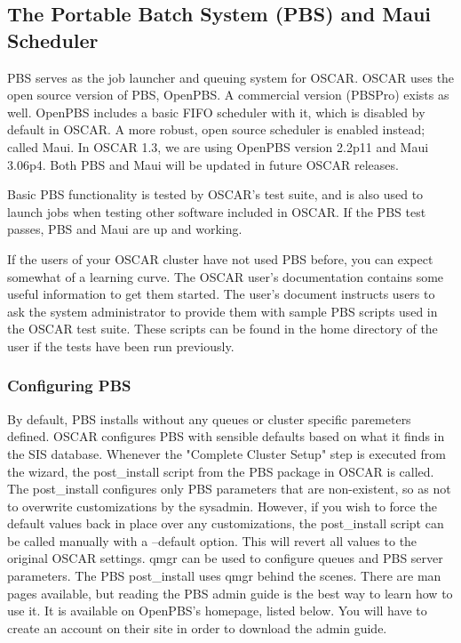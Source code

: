 %
%
%

\subsection{The Portable Batch System (PBS) and Maui Scheduler}
\label{app:pbs-overview}

PBS serves as the job launcher and queuing system for OSCAR.  OSCAR
uses the open source version of PBS, OpenPBS.  A commercial version
(PBSPro) exists as well.  OpenPBS includes a basic FIFO scheduler with
it, which is disabled by default in OSCAR.  A more robust, open source
scheduler is enabled instead; called Maui.  In OSCAR 1.3, we are using
OpenPBS version 2.2p11 and Maui 3.06p4.  Both PBS and Maui will be
updated in future OSCAR releases.

Basic PBS functionality is tested by OSCAR's test suite, and is also
used to launch jobs when testing other software included in OSCAR.  If
the PBS test passes, PBS and Maui are up and working.  

If the users of your OSCAR cluster have not used PBS before, you can
expect somewhat of a learning curve.  The OSCAR user's documentation
contains some useful information to get them started.  The user's
document instructs users to ask the system administrator to provide
them with sample PBS scripts used in the OSCAR test suite.  These
scripts can be found in the home directory of the  user
if the tests have been run previously.

\subsubsection{Configuring PBS}
By default, PBS installs without any queues or cluster specific
paremeters defined.  OSCAR configures PBS with sensible defaults based
on what it finds in the SIS database.  Whenever the "Complete Cluster
Setup" step is executed from the wizard, the post_install script from
the PBS package in OSCAR is called.  The post_install configures only
PBS parameters that are non-existent, so as not to overwrite customizations
by the sysadmin.  However, if you wish to force the default values back
in place over any customizations, the post_install script can be called
manually with a --default option.  This will revert all values to the 
original OSCAR settings.
qmgr can be used to configure queues and PBS server parameters.  The PBS
post_install uses qmgr behind the scenes.  There are man pages available,
but reading the PBS admin guide is the best way to learn how to use it.
It is available on OpenPBS's homepage, listed below.  You will have to 
create an account on their site in order to download the admin guide.

